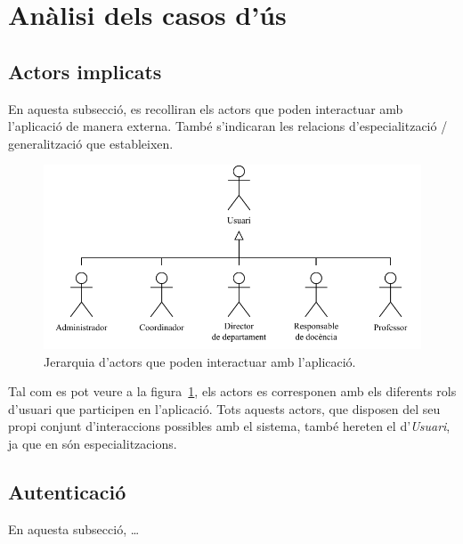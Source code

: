 \documentclass[a4paper,12pt]{ThesisStyle}
\begin{document}
\section{Anàlisi dels casos d'ús}
\label{sec:casos_us}

\subsection{Actors implicats}
\label{subsec:casos_us_actors}

En aquesta subsecció, es recolliran els actors que poden interactuar amb l'aplicació de manera externa. També s'indicaran les relacions d'especialització / generalització que estableixen.

\begin{figure}[H]
  \centering
  \includegraphics[width=\textwidth]{assets/use_cases/actors.pdf}
  \caption{\label{img:casos_us_actors}Jerarquia d'actors que poden interactuar amb l'aplicació.}
\end{figure}

Tal com es pot veure a la figura~\ref{img:casos_us_actors}, els actors es corresponen amb els diferents rols d'usuari que participen en l'aplicació. Tots aquests actors, que disposen del seu propi conjunt d'interaccions possibles amb el sistema, també hereten el d'\emph{Usuari}, ja que en són especialitzacions.

\subsection{Autenticació}
\label{subsec:casos_us_auth}

En aquesta subsecció, \dots
\end{document}
